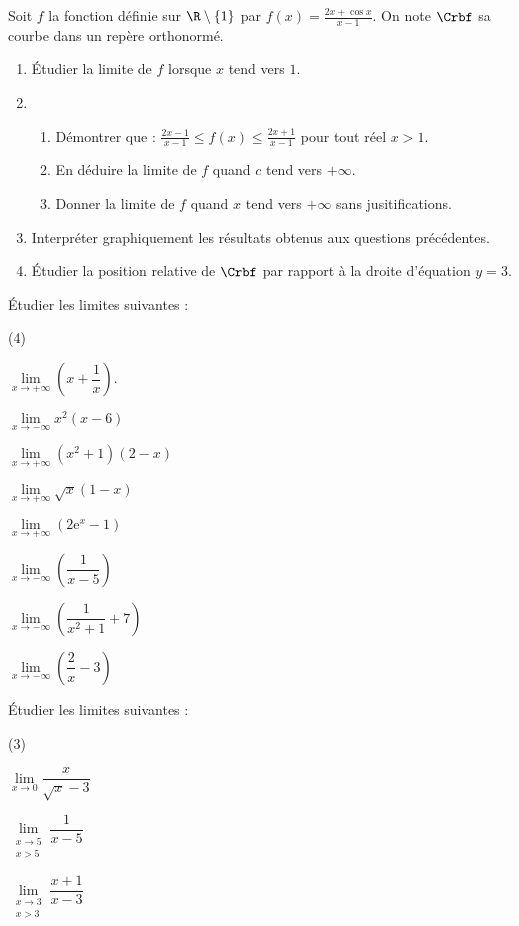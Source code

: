 \begin{exr}
Soit $f$ la fonction définie sur $\R\setminus\{1\}$ par $f(x)=\frac{2x+\cos x}{x-1}$. On note $\Crbf$ sa courbe dans un repère orthonormé.
\begin{enumerate}
\item \'Etudier la limite de $f$ lorsque $x$ tend vers $1$.
\item
    \begin{enumerate}
    \item Démontrer que : $\frac{2x-1}{x-1}\leqslant f(x)\leqslant \frac{2x+1}{x-1}$ pour tout réel $x>1$.
    \item En déduire la limite de $f$ quand $c$ tend vers $+\infty$.
    \item Donner la limite de $f$ quand $x$ tend vers $+\infty$ sans jusitifications.
    \end{enumerate}
\item Interpréter graphiquement les résultats obtenus aux questions précédentes.
\item \'Etudier la position relative de $\Crbf$ par rapport à la droite d'équation $y=3$.
\end{enumerate}
\end{exr}

\begin{exr}
Étudier les limites suivantes :

\begin{enumerate-}(4)
\item $\lim\limits_{x\rightarrow +\infty}\left(x+\dfrac{1}{x}\right)$.
\item $\lim\limits_{x\rightarrow -\infty}x^2(x-6)$
\item $\lim\limits_{x\rightarrow +\infty}\left(x^2+1\right)(2-x)$
\item $\lim\limits_{x\rightarrow +\infty}\sqrt{x}(1-x)$
\item $\lim\limits_{x\rightarrow +\infty}\left(2\mathrm{e}^{x}-1\right)$
\item $\lim\limits_{x\rightarrow -\infty}\left(\dfrac{1}{x-5}\right)$
\item $\lim\limits_{x\rightarrow -\infty}\left(\dfrac{1}{x^2+1}+7\right)$
\item $\lim\limits_{x\rightarrow -\infty}\left(\dfrac{2}{x}-3\right)$
\end{enumerate-}
\end{exr}

\begin{exr}
Étudier les limites suivantes :

\begin{enumerate-}(3)
\item $\lim\limits_{x\rightarrow 0}\dfrac{x}{\sqrt{x}-3}$
\item $\lim\limits_{\substack{x\rightarrow 5\\x>5}}\dfrac{1}{x-5}$
\item $\lim\limits_{\substack{x\rightarrow 3\\x>3 }}\dfrac{x+1}{x-3}$
\end{enumerate-}
\end{exr}

